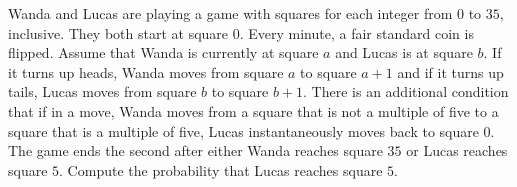 Wanda and Lucas are playing a game with squares for each integer from $0$ to $35$, inclusive. They both start at square $0$. Every minute, a fair standard coin is flipped. Assume that Wanda is currently at square $a$ and Lucas is at square $b$. If it turns up heads, Wanda moves from square $a$ to square $a+1$ and if it turns up tails, Lucas moves from square $b$ to square $b+1$. There is an additional condition that if in a move, Wanda moves from a square that is not a multiple of five to a square that is a multiple of five, Lucas instantaneously moves back to square $0$. The game ends the second after either Wanda reaches square $35$ or Lucas reaches square $5$. Compute the probability that Lucas reaches square $5$.